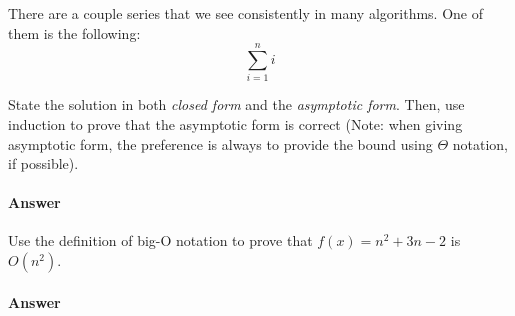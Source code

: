 \documentclass{article}
\begin{document}
\collab{\todo{}}

There are a couple series that we see consistently in many algorithms.  One of
them is the following:
$$
    \sum_{i=1}^n i
$$

State the solution in both \emph{closed form} and the \emph{asymptotic form}.
Then, use induction to prove that the asymptotic form is correct
(Note: when giving asymptotic form, the preference is always to
provide the bound using $\Theta$ notation, if possible).

\paragraph{Answer}
\todo{}

\collab{\todo{}}
Use the definition of big-O notation to prove that $f(x)=n^2 + 3n -2$ is
$O(n^2)$.

\paragraph{Answer}

\todo{}
\end{document}
